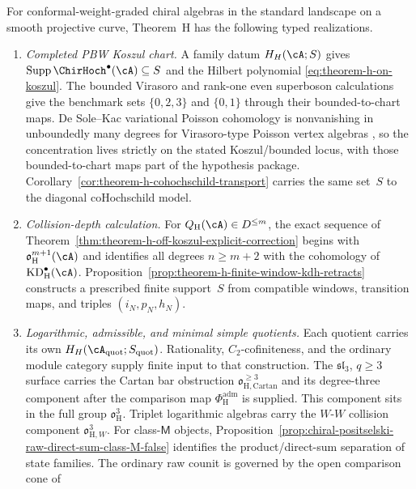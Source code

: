 \begin{theorem}
\label{thm:theorem-h-platonic-unified}
For conformal-weight-graded chiral algebras in the standard landscape
on a smooth projective curve, Theorem~H has the following typed
realizations.
\begin{enumerate}[label=\textup{(\alph*)}]
\item \emph{Completed PBW Koszul chart.}
A family datum $H_H(\cA;S)$ gives
$\operatorname{Supp}\ChirHoch^\bullet(\cA)\subseteq S$ and the
Hilbert polynomial \eqref{eq:theorem-h-on-koszul}.  The bounded
Virasoro and rank-one even superboson calculations give the benchmark
sets $\{0,2,3\}$ and $\{0,1\}$ through their bounded-to-chart maps.
De Sole--Kac variational Poisson cohomology is nonvanishing in
unboundedly many degrees for Virasoro-type Poisson vertex algebras
\cite{BDSK21}, so the concentration lives strictly on the stated
Koszul/bounded locus, with those bounded-to-chart maps part of the
hypothesis package.
Corollary~\ref{cor:theorem-h-cohochschild-transport} carries the same
set~$S$ to the diagonal coHochschild model.
\item \emph{Collision-depth calculation.}
For $Q_{\mathrm H}(\cA)\in D^{\leq m}$, the exact sequence of
Theorem~\ref{thm:theorem-h-off-koszul-explicit-correction} begins with
$\mathfrak{o}_{\mathrm H}^{m+1}(\cA)$ and identifies all degrees
$n\geq m+2$ with the cohomology of
$\mathrm{KD}_{\mathrm H}^{\bullet}(\cA)$.  Proposition~\ref{prop:theorem-h-finite-window-kdh-retracts}
constructs a prescribed finite support~$S$ from compatible windows,
transition maps, and triples $(i_N,p_N,h_N)$.
\item \emph{Logarithmic, admissible, and minimal simple quotients.}
Each quotient carries its own $H_H(\cA_{\mathrm{quot}};S_{\mathrm{quot}})$.
Rationality, $C_2$-cofiniteness, and the ordinary module category
supply finite input to that construction. The
$\mathfrak{sl}_3$, $q\geq3$ surface carries the Cartan
bar obstruction
$\mathfrak{o}_{\mathrm H,\mathrm{Cartan}}^{\ge3}$ and its
degree-three component after the comparison map
$\Phi_{\mathrm H}^{\mathrm{adm}}$ is supplied.  This component sits in
the full group
$\mathfrak{o}_{\mathrm H}^{3}$. Triplet logarithmic algebras carry the
$W$-$W$ collision component $\mathfrak{o}_{\mathrm H,W}^{3}$.
For class-\(\mathsf M\) objects, Proposition~\ref{prop:chiral-positselski-raw-direct-sum-class-M-false}
identifies the product/direct-sum separation of state families.  The
ordinary raw counit is governed by the open comparison cone of

\end{enumerate}
\end{theorem}
